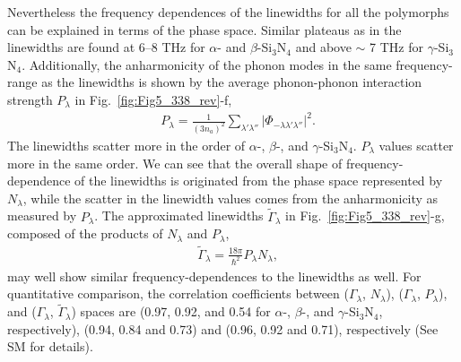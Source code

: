 \documentclass[twocolumn,amsmath,amssymb,a4paper,prb,superscriptaddress,floatfix]{revtex4-1}
\begin{document}


%
%
Nevertheless the frequency dependences of the linewidths for all the polymorphs
can be explained in terms of the phase space. Similar plateaus as in the
linewidths are found  at 6--8 THz for $\alpha$- and $\beta$-Si$_3$N$_4$ and
above $\sim$ 7 THz for $\gamma$-Si$_3$N$_4$. 
Additionally, the anharmonicity of the phonon modes in the same frequency-range
as the linewidths is shown by the average phonon-phonon interaction strength
$P_\lambda$ in Fig.~\ref{fig:Fig5_338_rev}-f, 
\begin{align}
 \label{eq:avepp}
 &P_\lambda = \frac{1}{(3n_a)^2}
  \sum_{\lambda' \lambda''}
  \bigl|\Phi_{-\lambda\lambda'\lambda''}\bigl|^2. 
\end{align}
The linewidths scatter more in the order of $\alpha$-, $\beta$-, and
$\gamma$-Si$_3$N$_4$.
$P_\lambda$ values scatter more in the same order. 
We can see that the overall shape of frequency-dependence of the linewidths is
originated from the phase space represented by $N_\lambda$, while the scatter in
the linewidth values comes from the anharmonicity as measured by $P_\lambda$.
The approximated linewidths $\tilde{\Gamma}_\lambda$ in
Fig.~\ref{fig:Fig5_338_rev}-g, composed of the products of $N_\lambda$ and
$P_\lambda$, 
\begin{align}
 \label{eq:tildegamma}
 &\tilde{\Gamma}_\lambda = \frac{18\pi}{\hbar^2}
 P_{\lambda}N_{\lambda},
\end{align}
may well show similar frequency-dependences to the linewidths as well. 
For quantitative comparison, the correlation coefficients between
($\Gamma_\lambda$, $N_\lambda$), ($\Gamma_\lambda$, $P_\lambda$), and
($\Gamma_\lambda$, $\tilde{\Gamma}_\lambda$) spaces are (0.97, 0.92, and 0.54 for
$\alpha$-, $\beta$-, and $\gamma$-Si$_3$N$_4$, respectively), (0.94, 0.84 and
0.73) and (0.96, 0.92 and 0.71), respectively (See SM for details).
 
\end{document}
